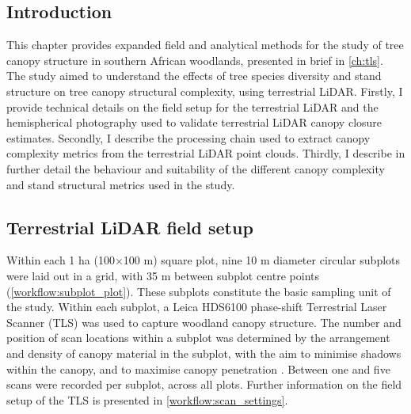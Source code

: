 \begin{refsection}





\chapter[\chaptertitle]{\chaptertitle}
\label{ch:workflow}

\section{Introduction}
\label{workflow:sec:intro}

This chapter provides expanded field and analytical methods for the study of tree canopy structure in southern African woodlands, presented in brief in \autoref{ch:tls}. The study aimed to understand the effects of tree species diversity and stand structure on tree canopy structural complexity, using terrestrial LiDAR. Firstly, I provide technical details on the field setup for the terrestrial LiDAR and the hemispherical photography used to validate terrestrial LiDAR canopy closure estimates. Secondly, I describe the processing chain used to extract canopy complexity metrics from the terrestrial LiDAR point clouds. Thirdly, I describe in further detail the behaviour and suitability of the different canopy complexity and stand structural metrics used in the study.

\section{Terrestrial LiDAR field setup}
\label{workflow:sec:lidar_field}

Within each 1 ha (100$\times$100 m) square plot, nine 10 m diameter circular subplots were laid out in a grid, with 35 m between subplot centre points (\autoref{workflow:subplot_plot}). These subplots constitute the basic sampling unit of the study. Within each subplot, a Leica HDS6100 phase-shift Terrestrial Laser Scanner (TLS) was used to capture woodland canopy structure. The number and position of scan locations within a subplot was determined by the arrangement and density of canopy material in the subplot, with the aim to minimise shadows within the canopy, and to maximise canopy penetration \citep{Beland2021b}. Between one and five scans were recorded per subplot, across all plots. Further information on the field setup of the TLS is presented in \autoref{workflow:scan_settings}.


\end{refsection}
